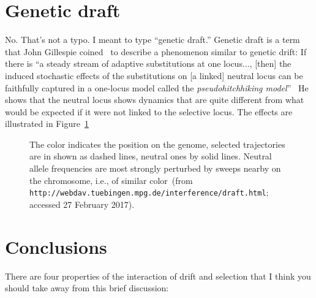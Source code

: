 \documentclass[12pt]{article}
\begin{document}
\section*{Genetic draft}

No. That's not a typo. I meant to type ``genetic draft.'' Genetic
draft is a term that John Gillespie coined~\cite{Gillespie-2000} to
describe a phenomenon similar to genetic drift: If there is ``a steady
stream of adaptive substitutions at one locus$\dots$, [then] the
induced stochastic effects of the substitutions on [a linked] neutral
locus can be faithfully captured in a one-locus model called the {\it
  pseudohitchhiking model}''~\cite[p. 909]{Gillespie-2000} He shows
that the neutral locus shows dynamics that are quite different from
what would be expected if it were not linked to the selective
locus. The effects are illustrated in Figure~\ref{fig:genetic-draft}

\begin{figure}
\begin{center}
\end{center}
\caption{The color indicates the position on the genome, selected
  trajectories are in shown as dashed lines, neutral ones by solid
  lines. Neutral allele frequencies are most strongly perturbed by
  sweeps nearby on the chromosome, i.e., of similar color~(from
  {\tt http://webdav.tuebingen.mpg.de/interference/draft.html};
  accessed 27 February 2017).}\label{fig:genetic-draft}  
\end{figure}

\section*{Conclusions}

There are four properties of the interaction of drift and selection
that I think you should take away from this brief
discussion:
\end{document}
